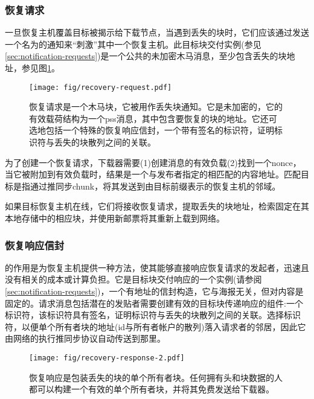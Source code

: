 \subsubsection{恢复请求}

一旦恢复主机覆盖目标被揭示给下载节点，当遇到丢失的块时，它们应该通过发送一个名为的通知来“刺激”其中一个恢复主机。此目标块交付实例(参见\ref{sec:notification-requests})是一个公共的未加密木马消息，至少包含丢失的块地址，参见图\ref{fig:recovery-request}。

\begin{figure}[htbp]
  \centering
  \texttt{[image: fig/recovery-request.pdf]}
  \caption[恢复请求\statusgreen]{恢复请求是一个木马块，它被用作丢失块通知。它是未加密的，它的有效载荷结构为一个pss消息，其中包含要恢复的块的地址。它还可选地包括一个特殊的恢复响应信封，一个带有签名的标识符，证明标识符与丢失的块散列之间的关联。}
  \label{fig:recovery-request}
\end{figure}

为了创建一个恢复请求，下载器需要(1)创建消息的有效负载(2)找到一个nonce，当它被附加到有效负载时，结果是一个与发布者指定的相匹配的内容地址。匹配目标是指通过推同步chunk，将其发送到由目标前缀表示的恢复主机的邻域。

如果目标恢复主机在线，它们将接收恢复请求，提取丢失的块地址，检索固定在其本地存储中的相应块，并使用新邮票将其重新上载到网络。

\subsubsection{恢复响应信封}

的作用是为恢复主机提供一种方法，使其能够直接响应恢复请求的发起者，迅速且没有相关的成本或计算负担。它是目标块交付响应的一个实例(请参阅\ref{sec:notification-requests})，一个有地址的信封构造，它与海报无关，但对内容是固定的。请求消息包括潜在的发贴者需要创建有效的目标块传递响应的组件:一个标识符，该标识符具有签名，证明标识符与丢失的块散列之间的关联。选择标识符，以便单个所有者块的地址(id与所有者帐户的散列)落入请求者的邻居，因此它由网络的执行推同步协议自动传送到那里。

\begin{figure}[htbp]
\centering
\texttt{[image: fig/recovery-response-2.pdf]}
\caption[恢复响应\statusgreen]{恢复响应是包装丢失的块的单个所有者块。任何拥有头和块数据的人都可以构建一个有效的单个所有者块，并将其免费发送给下载器。}
\label{fig:recovery-response}
\end{figure}

